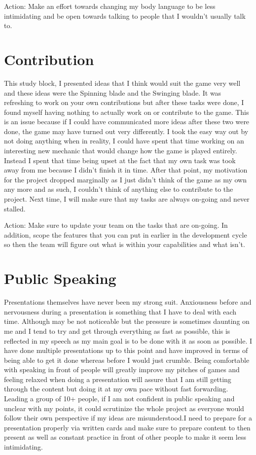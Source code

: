 \documentclass{scrartcl}
\begin{document}
Action: Make an effort towards changing my body language to be less intimidating and be open towards talking to people that I wouldn't usually talk to. 


\section{Contribution}
This study block, I presented ideas that I think would suit the game very well and these ideas were the Spinning blade and the Swinging blade. It was refreshing to work on your own contributions but after these tasks were done, I found myself having nothing to actually work on or contribute to the game. This is an issue because if I could have communicated more ideas after these two were done, the game may have turned out very differently. I took the easy way out by not doing anything when in reality, I could have spent that time working on an interesting new mechanic that would change how the game is played entirely. Instead I spent that time being upset at the fact that my own task was took away from me because I didn't finish it in time. After that point, my motivation for the project dropped marginally as I just didn't think of the game as my own any more and as such, I couldn't think of anything else to contribute to the project. Next time, I will make sure that my tasks are always on-going and never stalled.

Action: Make sure to update your team on the tasks that are on-going. In addition, scope the features that you can put in earlier in the development cycle so then the team will figure out
what is within your capabilities and what isn't.

\section{Public Speaking}
Presentations themselves have never been my strong suit. Anxiousness before and nervousness during a presentation is something that I have to deal with each time. Although may be not noticeable but the pressure is sometimes daunting on me and I tend to try and get through everything as fast as possible, this is reflected in my speech as my main goal is to be done with it as soon as possible. I have done multiple presentations up to this point and have improved in terms of being able
to get it done whereas before I would just crumble. Being comfortable with speaking in
front of people will greatly improve my pitches of games and feeling relaxed when doing
a presentation will assure that I am still getting through the content but doing it at my
own pace without fast forwarding. Leading a group of 10+ people, if I am not confident
in public speaking and unclear with my points, it could scrutinize the whole project as
everyone would follow their own perspective if my ideas are misunderstood.I need to prepare for a presentation properly via written cards and make sure to prepare content to then present as well as constant practice in front of other people to make it seem less intimidating.
\end{document}
